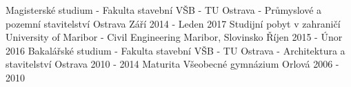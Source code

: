 \vspace{3mm}


\begin{cventries}

  \cventry
    {Magisterské studium - Fakulta stavební}
    {VŠB - TU Ostrava - Průmyslové a pozemní stavitelství}
    {Ostrava}
    {Září 2014 - Leden 2017}
    {}
  \cventry
    {Studijní pobyt v zahraničí}
    {University of Maribor - Civil Engineering}
    {Maribor, Slovinsko}
    {Říjen 2015 - Únor 2016}
    {}
  \cventry
    {Bakalářské studium - Fakulta stavební} %
    {VŠB - TU Ostrava - Architektura a stavitelství} %
    {Ostrava} %
    {2010 - 2014} %
    {}
  \cventry
    {Maturita} %
    {Všeobecné gymnázium} %
    {Orlová} %
    {2006 - 2010} %
    {}
    
    

\end{cventries}
